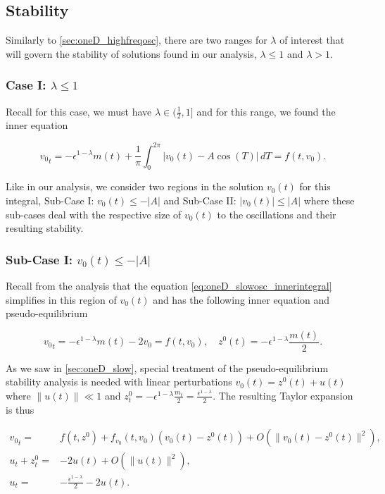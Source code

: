 \subsection{Stability}

Similarly to \autoref{sec:oneD_highfreqosc}, there are two ranges for $\lambda$ of interest that will govern the stability of solutions found in our analysis, $\lambda\le 1$ and $\lambda>1$.

\subsubsection{Case I: $\lambda\le 1$}

Recall for this case, we must have $\lambda\in (\frac{1}{2},1]$ and for this range, we found the inner equation

\begin{equation}\label{eq:oneD_slowosc_innerintegral}
{v_0}_t= -\epsilon^{1-\lambda}m(t)+\frac{1}{\pi}\int_0^{2\pi}| v_0(t)- A\cos(T)|\,dT=f(t,v_0).
\end{equation}

Like in our analysis, we consider two regions in the solution $v_0(t)$ for this integral, Sub-Case I: $v_0(t)\le - |A|$ and Sub-Case II: $|v_0(t)|\le |A|$ where these sub-cases deal with the respective size of $v_0(t)$ to the oscillations and their resulting stability.

\subsubsection*{Sub-Case I: $v_0(t)\le - |A|$}

Recall from the analysis that the equation \eqref{eq:oneD_slowosc_innerintegral} simplifies in this region of $v_0(t)$ and has the following inner equation and pseudo-equilibrium

\begin{equation}\label{eq:oneD_slowosc_stabilitysubcaseI}
{v_0}_t= -\epsilon^{1-\lambda}m(t) -2v_0=f(t,v_0), \quad z^0(t)=-\epsilon^{1-\lambda}\frac{m(t)}{2}.
\end{equation}

As we saw in \autoref{sec:oneD_slow}, special treatment of the pseudo-equilibrium stability analysis is needed with linear perturbations $v_0(t)=z^0(t)+u(t)$ where $\lVert u(t)\rVert \ll 1$ and $z^0_t = -\epsilon^{1-\lambda}\frac{m_t}{2}=\frac{\epsilon^{1-\lambda}}{2}$. The resulting Taylor expansion is thus

\begin{equation*}
\begin{aligned}
{v_0}_t =& f(t,z^0)+f_{v_0}(t,v_0)(v_0(t)-z^0(t))+O(\lVert v_0(t)-z^0(t) \rVert^2),\\
u_t+z^0_t=&-2u(t)+O(\lVert u(t)\rVert^2),\\
u_t =&-\frac{\epsilon^{1-\lambda}}{2}-2u(t).
\end{aligned}
\end{equation*}

